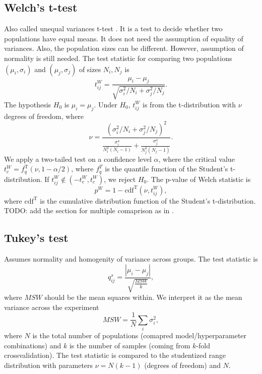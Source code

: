 \documentclass[a4paper]{article}
\begin{document}
\subsection{Welch's t-test}
Also called unequal variances t-test \cite{welch1947generalization}. It is a test to decide whether two populations have equal means. It does not need the assumption of equality of variances. Also, the population sizes can be different. However, assumption of normality is still needed. The test statistic for comparing two populations $(\mu_i, \sigma_i)$ and $(\mu_j, \sigma_j)$ of sizes $N_i,N_j$ is
\begin{equation}
	t^W_{ij} = \frac{\mu_i - \mu_j}{\sqrt{\sigma_i^2/N_i + \sigma_j^2/N_j}}.
\end{equation}
The hypothesis $H_0$ is $\mu_i = \mu_j$. Under $H_0$, $t^W_{ij}$ is from the t-distribution with $\nu$ degrees of freedom, where 
\begin{equation}
	\nu = \frac{\left( \sigma_i^2/N_i + \sigma_j^2/N_j\right)^2}{\frac{\sigma_i^4}{N^2_i(N_i-1)} + \frac{\sigma_j^4}{N^2_j(N_j-1)}}.
\end{equation}
We apply a two-tailed test on a confidence level $\alpha$, where the critical value $t^W_c = f_q^\text{T}(\nu, 1-\alpha/2)$, where $f_q^T$ is the quantile function of the Student's t-distribution. If $t^W_{ij} \notin (-t^W_c, t^W_c)$, we reject $H_0$. The p-value of Welch statistic is
\begin{equation}
	p^W = 1-\text{cdf}^\text{T}(\nu, t^W_{ij}),
\end{equation}
where $\text{cdf}^\text{T}$ is the cumulative distribution function of the Student's t-distribution. TODO: add the section for multiple comaprison as in \cite{welch1951comparison}.

\subsection{Tukey's test}
Assumes normality and homogenity of variance across groups. The test statistic is
\begin{equation}
	q^s_{ij} = \frac{|\mu_i - \mu_j|}{\sqrt{\frac{MSW}{k}}},
\end{equation}
where $MSW$ should be the mean squares within. We interpret it as the mean variance across the experiment
\begin{equation}
	MSW = \frac{1}{N}\sum_i \sigma^2_i,
\end{equation}
where $N$ is the total number of populations (comapred model/hyperparameter combinations) and $k$ is the number of samples (coming from $k$-fold crossvalidation). The test statistic is compared to the studentized range distribution with parameters $\nu = N(k-1)$ (degrees of freedom) and $N$.
\end{document}
